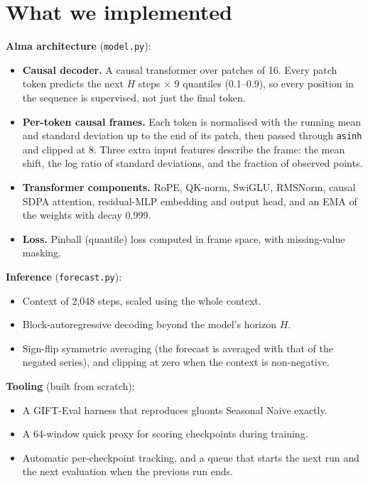 \documentclass[10pt,twocolumn]{extarticle}
\begin{document}
\section{What we implemented}
\textbf{Alma architecture}
(\texttt{model.py}):
\begin{itemize}
\item \textbf{Causal decoder.} A causal transformer over patches of 16. Every patch
token predicts the next $H$ steps $\times$ 9 quantiles (0.1--0.9), so every
position in the sequence is supervised, not just the final token.
\item \textbf{Per-token causal frames.} Each token is normalised with the running
mean and standard deviation up to the end of its patch, then passed through
\texttt{asinh} and clipped at 8. Three extra input features describe the frame:
the mean shift, the log ratio of standard deviations, and the fraction of observed
points.
\item \textbf{Transformer components.} RoPE, QK-norm, SwiGLU, RMSNorm, causal SDPA
attention, residual-MLP embedding and output head, and an EMA of the weights with
decay 0.999.
\item \textbf{Loss.} Pinball (quantile) loss computed in frame space, with
missing-value masking.
\end{itemize}
\textbf{Inference}
(\texttt{forecast.py}):
\begin{itemize}
\item Context of 2{,}048 steps, scaled using the whole context.
\item Block-autoregressive decoding beyond the model's horizon $H$.
\item Sign-flip symmetric averaging (the forecast is averaged with that of the
negated series), and clipping at zero when the context is non-negative.
\end{itemize}
\textbf{Tooling} (built from scratch):
\begin{itemize}
\item A GIFT-Eval harness that reproduces gluonts Seasonal Naive exactly.
\item A 64-window quick proxy for scoring checkpoints during training.
\item Automatic per-checkpoint tracking, and a queue that starts the next run and
the next evaluation when the previous run ends.
\end{itemize}
\end{document}
